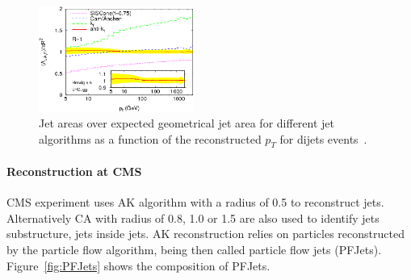 \begin{figure}[!Hhtbp]
  \begin{center}
    \includegraphics[width=0.45\textwidth]{figs/JetArea.png}
    \caption{Jet areas over expected geometrical jet area for different jet algorithms as a function of the reconstructed $p_{T}$ for dijets events~\cite{Cacciari:2008gp}.}
    \label{fig:JetsAlgosArea}
  \end{center}
\end{figure}

\paragraph{Reconstruction at CMS}

CMS experiment uses AK algorithm with a radius of 0.5 to reconstruct jets. Alternatively CA with radius of 0.8, 1.0 or 1.5 are also used to identify jets substructure, jets inside jets. AK reconstruction relies on particles reconstructed by the particle flow algorithm, being then called particle flow jets (PFJets). Figure~\ref{fig:PFJets} shows the composition of PFJets.  


